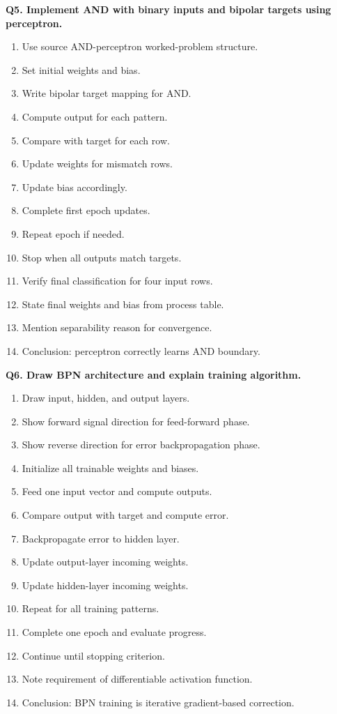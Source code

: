 \documentclass[11pt,a4paper]{article}
\begin{document}
\textbf{Q5. Implement AND with binary inputs and bipolar targets using perceptron.}
\begin{enumerate}
\item Use source AND-perceptron worked-problem structure.
\item Set initial weights and bias.
\item Write bipolar target mapping for AND.
\item Compute output for each pattern.
\item Compare with target for each row.
\item Update weights for mismatch rows.
\item Update bias accordingly.
\item Complete first epoch updates.
\item Repeat epoch if needed.
\item Stop when all outputs match targets.
\item Verify final classification for four input rows.
\item State final weights and bias from process table.
\item Mention separability reason for convergence.
\item Conclusion: perceptron correctly learns AND boundary.
\end{enumerate}

\textbf{Q6. Draw BPN architecture and explain training algorithm.}
\begin{enumerate}
\item Draw input, hidden, and output layers.
\item Show forward signal direction for feed-forward phase.
\item Show reverse direction for error backpropagation phase.
\item Initialize all trainable weights and biases.
\item Feed one input vector and compute outputs.
\item Compare output with target and compute error.
\item Backpropagate error to hidden layer.
\item Update output-layer incoming weights.
\item Update hidden-layer incoming weights.
\item Repeat for all training patterns.
\item Complete one epoch and evaluate progress.
\item Continue until stopping criterion.
\item Note requirement of differentiable activation function.
\item Conclusion: BPN training is iterative gradient-based correction.
\end{enumerate}
\end{document}
